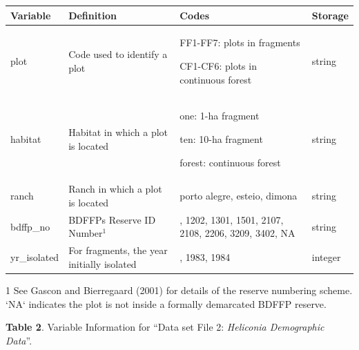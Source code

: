 \documentclass[
  12pt,
  man, donotrepeattitle,floatsintext]{apa6}
\begin{document}
\begin{table}
\centering
\begin{threeparttable}
\begin{tabular}{>{\raggedright\arraybackslash}p{5em}>{\raggedright\arraybackslash}p{18em}>{\raggedright\arraybackslash}p{17em}>{\raggedright\arraybackslash}p{3em}}
\toprule
\textbf{Variable} & \textbf{Definition} & \textbf{Codes} & \textbf{Storage}\\
\midrule
plot & Code used to identify a plot & FF1-FF7: plots in fragments
  
CF1-CF6: plots in continuous forest & string\\
\midrule
habitat & Habitat in which a plot is located & one: 1-ha fragment
  
ten: 10-ha fragment
  
forest: continuous forest & string\\
\midrule
ranch & Ranch in which a plot is located & porto alegre, esteio, dimona & string\\
\midrule
bdffp\_no & BDFFPs Reserve ID Number$^{1}$ & 1104, 1202, 1301, 1501, 2107, 2108, 2206, 3209, 3402, NA & string\\
\midrule
yr\_isolated & For fragments, the year initially isolated & 1980, 1983, 1984 & integer\\
\bottomrule
\end{tabular}
\begin{tablenotes}
\item[1] See Gascon and Bierregaard (2001) for details of the reserve numbering scheme. `NA` indicates the plot is not inside a formally demarcated BDFFP reserve.
\end{tablenotes}
\end{threeparttable}
\end{table}

\newpage

\textbf{Table 2}. Variable Information for ``Data set File 2: \emph{Heliconia Demographic Data}''.
\renewcommand{\arraystretch}{0.5}
\end{document}

